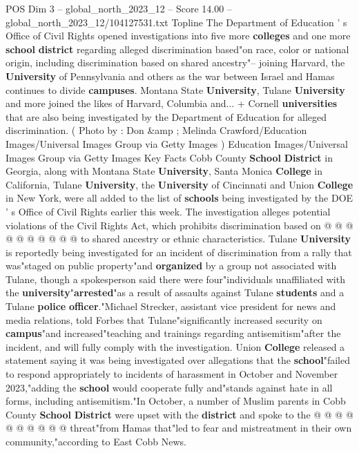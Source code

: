 \begin{textsample}{POS Dim 3 – global\_north\_2023\_12 – Score 14.00 – global\_north\_2023\_12/104127531.txt}  \label{ex:f3_pos_263}
Topline The Department of Education ' s Office of Civil Rights opened investigations into five more \textbf{colleges} and one more \textbf{school} \textbf{district} regarding alleged discrimination based"on race, color or national origin, including discrimination based on shared ancestry"-- joining Harvard, the \textbf{University} of Pennsylvania and others as the war between Israel and Hamas continues to divide \textbf{campuses}.
Montana State \textbf{University}, Tulane \textbf{University} and more joined the likes of Harvard, Columbia and... + Cornell \textbf{universities} that are also being investigated by the Department of Education for alleged discrimination. ( Photo by : Don \&amp ; Melinda Crawford/Education Images/Universal Images Group via Getty Images ) Education Images/Universal Images Group via Getty Images Key Facts Cobb County \textbf{School} \textbf{District} in Georgia, along with Montana State \textbf{University}, Santa Monica \textbf{College} in California, Tulane \textbf{University}, the \textbf{University} of Cincinnati and Union \textbf{College} in New York, were all added to the list of \textbf{schools} being investigated by the DOE ' s Office of Civil Rights earlier this week.
The investigation alleges potential violations of the Civil Rights Act, which prohibits discrimination based on @ @ @ @ @ @ @ @ @ @ to shared ancestry or ethnic characteristics.
Tulane \textbf{University} is reportedly being investigated for an incident of discrimination from a rally that was"staged on public property"and \textbf{organized} by a group not associated with Tulane, though a spokesperson said there were four"individuals unaffiliated with the \textbf{university}"\textbf{arrested}"as a result of assaults against Tulane \textbf{students} and a Tulane \textbf{police} \textbf{officer}."Michael Strecker, assistant vice president for news and media relations, told Forbes that Tulane"significantly increased security on \textbf{campus}"and increased"teaching and trainings regarding antisemitism"after the incident, and will fully comply with the investigation.
Union \textbf{College} released a statement saying it was being investigated over allegations that the \textbf{school}"failed to respond appropriately to incidents of harassment in October and November 2023,"adding the \textbf{school} would cooperate fully and"stands against hate in all forms, including antisemitism."In October, a number of Muslim parents in Cobb County \textbf{School} \textbf{District} were upset with the \textbf{district} and spoke to the @ @ @ @ @ @ @ @ @ @ threat"from Hamas that"led to fear and mistreatment in their own community,"according to East Cobb News.

\end{textsample}
